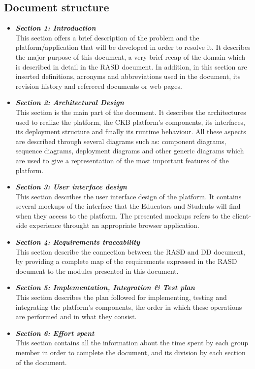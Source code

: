 \documentclass{article}
\begin{document}
{\subsection{Document structure}
\begin{itemize}
    \item \textbf{\textit{Section 1: Introduction}} \\
          This section offers a brief description of the problem and the platform/application 
          that will be developed in order to resolve it.
          It describes the major purpose of this document, a very brief recap of the domain which 
          is described in detail in the RASD document.
          In addition, in this section are inserted definitions, acronyms and abbreviations used 
          in the document, its revision history and refereced documents or web pages.
    \item \textbf{\textit{Section 2: Architectural Design}} \\
          This section is the main part of the document. It describes the architectures used to
          realize the platform, the CKB platform's components, its interfaces, its deployment
          structure and finally its runtime behaviour.
          All these aspects are described through several diagrams such as:
          component diagrams, sequence diagrams, deployment diagrams and other
          generic diagrams which are used to give a representation of the most important
          features of the platform.
    \item \textbf{\textit{Section 3: User interface design}} \\
          This section describes the user interface design of the platform.
          It contains several mockups of the interface that the Educators and
          Students will find when they access to the platform. The presented mockups
          refers to the client-side experience throught an appropriate browser application.
    \item \textbf{\textit{Section 4: Requirements traceability}} \\
          This section describe the connection between the RASD and DD document,
          by providing a complete map of the requirements expressed in the RASD document
          to the modules presented in this document.
    \item \textbf{\textit{Section 5: Implementation, Integration \& Test plan}} \\
          This section describes the plan followed for implementing, testing and
          integrating the platform's components, the order in which
          these operations are performed and in what they consist.
    \item \textbf{\textit{Section 6: Effort spent}} \\
          This section contains all the information about the time spent by each group member
          in order to complete the document, and its division by each section of the document.
\end{itemize}

}
\end{document}
